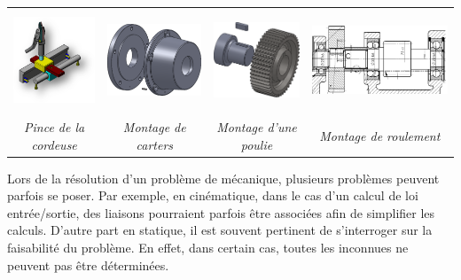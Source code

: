 \documentclass[10pt]{article}
\begin{document}



\begin{center}
\begin{tabular}{cccc}
\includegraphics[height=3cm]{images/ex1} &
\includegraphics[height=3cm]{images/ex2} &
\includegraphics[height=3cm]{images/ex3} &
\includegraphics[height=3cm]{images/ex4} \\
\textit{Pince de la cordeuse} & 
\textit{Montage de carters} &
\textit{Montage d'une poulie} &
\textit{Montage de roulement}\\
\end{tabular}
\end{center}

Lors de la résolution d'un problème de mécanique, plusieurs problèmes peuvent parfois se poser. Par exemple, en cinématique, dans le cas d'un calcul de loi entrée/sortie, des liaisons pourraient parfois être associées afin de simplifier les calculs. D'autre part en statique, il est souvent pertinent de s'interroger sur la faisabilité du problème. En effet, dans certain cas, toutes les inconnues ne peuvent pas être déterminées.
\end{document}

